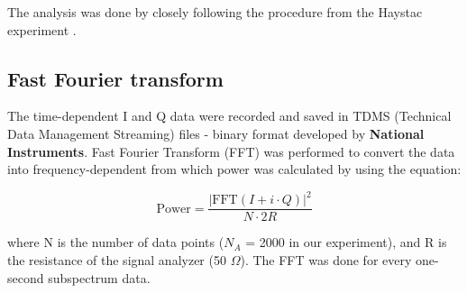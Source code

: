     The analysis was done by closely following the procedure from the Haystac experiment \cite{}. 

\subsection{Fast Fourier transform}
The time-dependent I and Q data were recorded and saved in TDMS (Technical Data Management Streaming) files - binary format developed by \textbf{National Instruments}.
Fast Fourier Transform (FFT) was performed to convert the data into frequency-dependent from which power was calculated by using the equation:

\begin{equation}
\label{eq:4.1}
    \text{Power} = \frac{|\text{FFT}(I+i \cdot Q)|^{2}}{N \cdot 2R}
\end{equation}

where N is the number of data points ($N_A $ = 2000 in our experiment), and R is the resistance of the signal analyzer (50 $\Omega$).
The FFT was done for every one-second subspectrum data.


